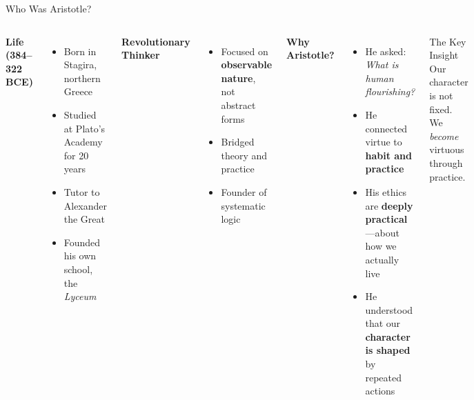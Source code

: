 ﻿\documentclass[aspectratio=169,11pt]{beamer}
\begin{document}
\begin{frame}{Who Was Aristotle?}
\begin{columns}[T]
\textbf{Life (384--322 BCE)}
\begin{itemize}
    \item Born in Stagira, northern Greece
    \item Studied at Plato's Academy for 20 years
    \item Tutor to Alexander the Great
    \item Founded his own school, the \textit{Lyceum}
\end{itemize}

\vspace{0.3cm}
\textbf{Revolutionary Thinker}
\begin{itemize}
    \item Focused on \textbf{observable nature}, not abstract forms
    \item Bridged theory and practice
    \item Founder of systematic logic
\end{itemize}

\textbf{Why Aristotle?}
\begin{itemize}
    \item He asked: \textit{What is human flourishing?}
    \item He connected virtue to \textbf{habit and practice}
    \item His ethics are \textbf{deeply practical}---about how we actually live
    \item He understood that our \textbf{character is shaped} by repeated actions
\end{itemize}

\vspace{0.3cm}
\begin{alertblock}{The Key Insight}
Our character is not fixed. We \textit{become} virtuous through practice.
\end{alertblock}
\end{columns}
\end{frame}
\end{document}
